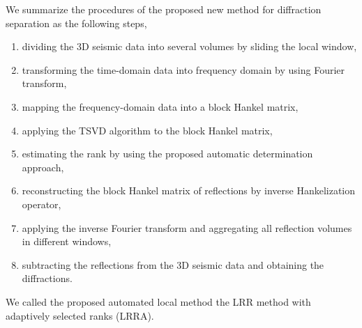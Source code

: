 We summarize the procedures of the proposed new method for diffraction separation as the following steps,
\begin{enumerate}
\item dividing the 3D seismic data into several volumes by sliding the local window,
\item transforming the time-domain data into frequency domain by using Fourier transform,
\item mapping the frequency-domain data into a block Hankel matrix,
\item applying the TSVD algorithm to the block Hankel matrix,
\item estimating the rank by using the proposed automatic determination approach,
\item reconstructing the block Hankel matrix of reflections by inverse Hankelization operator,
\item applying the inverse Fourier transform and aggregating all reflection volumes in different windows,
\item subtracting the reflections from the 3D seismic data and obtaining the diffractions. 
\end{enumerate}
We called the proposed automated local method the LRR method with adaptively selected ranks (LRRA). 

